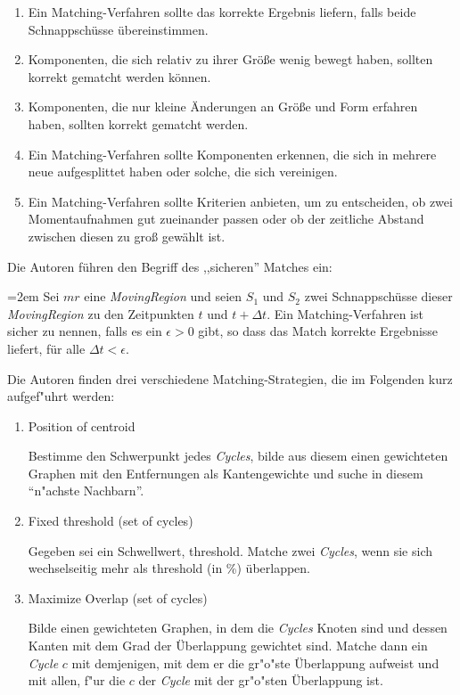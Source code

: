 \begin{enumerate}
\item Ein Matching-Verfahren sollte das korrekte Ergebnis liefern, falls beide Schnappschüsse übereinstimmen.
\item Komponenten, die sich relativ zu ihrer Größe wenig bewegt haben, sollten korrekt gematcht werden können.
\item Komponenten, die nur kleine Änderungen an Größe und Form erfahren haben, sollten korrekt gematcht werden.
\item Ein Matching-Verfahren sollte Komponenten erkennen, die sich in mehrere neue aufgesplittet haben oder solche, die sich vereinigen.
\item Ein Matching-Verfahren sollte Kriterien anbieten, um zu entscheiden, ob zwei Momentaufnahmen gut zueinander passen oder ob der zeitliche Abstand zwischen diesen zu groß gewählt ist.
\end{enumerate}

Die Autoren führen den Begriff des ,,sicheren'' Matches ein:

\par
\begingroup
\leftskip=2em 
Sei $mr$ eine \textit{MovingRegion} und seien $S_1$ und $S_2$ zwei Schnappschüsse dieser \textit{MovingRegion} zu den Zeitpunkten $t$ und $t+\Delta t$. Ein Matching-Verfahren ist sicher zu nennen, falls es ein $\epsilon >0$ gibt, so dass das Match korrekte Ergebnisse liefert, für alle $\Delta t < \epsilon$.
\par
\endgroup

Die Autoren finden drei verschiedene Matching-Strategien, die im Folgenden kurz aufgef"uhrt werden:
\begin{enumerate}
\item Position of centroid \label{MatchSchwer}

Bestimme den Schwerpunkt jedes \textit{Cycles},  bilde aus diesem einen gewichteten Graphen mit den Entfernungen als Kantengewichte und suche in diesem "`n"achste Nachbarn"'.
\item Fixed threshold (set of cycles)\label{fixedThre}

Gegeben sei ein Schwellwert, threshold. Matche zwei \textit{Cycles}, wenn sie sich wechselseitig  mehr als threshold (in \%) überlappen.

\item Maximize Overlap (set of cycles)\label{MaxOver}

Bilde einen gewichteten Graphen, in dem die \textit{Cycles} Knoten sind und dessen Kanten mit dem Grad der Überlappung gewichtet sind. Matche dann ein \textit{Cycle} $c$ mit demjenigen, mit dem er die gr"o"ste Überlappung aufweist und mit allen, f"ur die $c$ der \textit{Cycle} mit der gr"o"sten Überlappung ist.
\end{enumerate} 

